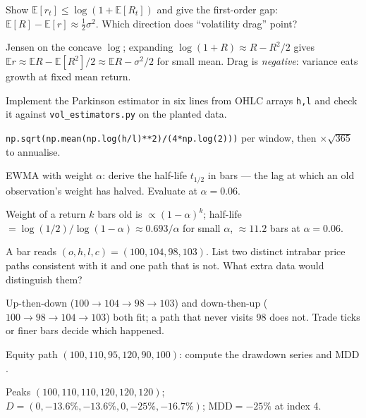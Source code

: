 \begin{exercise}[medium]
Show $\mathbb E[r_t]\le\log(1+\mathbb E[R_t])$ and give the
first-order gap: $\mathbb E[R]-\mathbb E[r]\approx\tfrac12\sigma^2$.
Which direction does ``volatility drag'' point?
\end{exercise}
\begin{solution}
Jensen on the concave $\log$; expanding
$\log(1+R)\approx R-R^2/2$ gives
$\mathbb E r\approx\mathbb E R-\mathbb E[R^2]/2\approx\mathbb E R
-\sigma^2/2$ for small mean. Drag is \emph{negative}: variance eats
growth at fixed mean return.
\end{solution}
\begin{exercise}[medium]
Implement the Parkinson estimator in six lines from OHLC arrays
\texttt{h,l} and check it against \texttt{vol\_estimators.py} on the
planted data.
\end{exercise}
\begin{solution}
\texttt{np.sqrt(np.mean(np.log(h/l)**2)/(4*np.log(2)))} per window,
then $\times\sqrt{365}$ to annualise.
\end{solution}
\begin{exercise}[medium]
EWMA with weight $\alpha$: derive the half-life $t_{1/2}$ in bars ---
the lag at which an old observation's weight has halved. Evaluate at
$\alpha=0.06$.
\end{exercise}
\begin{solution}
Weight of a return $k$ bars old is $\propto(1-\alpha)^k$; half-life
$=\log(1/2)/\log(1-\alpha)\approx0.693/\alpha$ for small $\alpha$,
$\approx11.2$ bars at $\alpha=0.06$.
\end{solution}
\begin{exercise}[medium]
A bar reads $(o,h,l,c)=(100,104,98,103)$. List two distinct intrabar
price paths consistent with it and one path that is not. What extra
data would distinguish them?
\end{exercise}
\begin{solution}
Up-then-down ($100\to104\to98\to103$) and down-then-up
($100\to98\to104\to103$) both fit; a path that never visits 98 does
not. Trade ticks or finer bars decide which happened.
\end{solution}
\begin{exercise}[medium]
Equity path $(100,110,95,120,90,100)$: compute the drawdown series
and $\mathrm{MDD}$.
\end{exercise}
\begin{solution}
Peaks $(100,110,110,120,120,120)$; $D=(0,-13.6\%,-13.6\%,0,-25\%,
-16.7\%)$; $\mathrm{MDD}=-25\%$ at index 4.
\end{solution}
